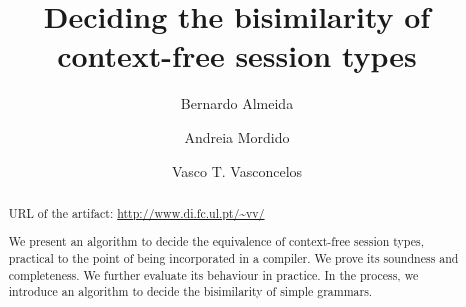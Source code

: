 \documentclass[orivec,runningheads]{llncs}
\begin{document}
\title{Deciding the bisimilarity of context-free session types
}


\author{Bernardo Almeida \and
Andreia Mordido \and
Vasco T. Vasconcelos}

%
%



%
%
%


\maketitle

\begin{abstract}
  URL of the artifact: \url{http://www.di.fc.ul.pt/~vv/}
  \par
  We present an algorithm to decide the equivalence of context-free
  session types, practical to the point of being incorporated in a
  compiler. We prove its soundness and completeness. We further
  evaluate its behaviour in practice. In the process, we introduce an
  algorithm to decide the bisimilarity of simple grammars.


\end{abstract}
\end{document}

